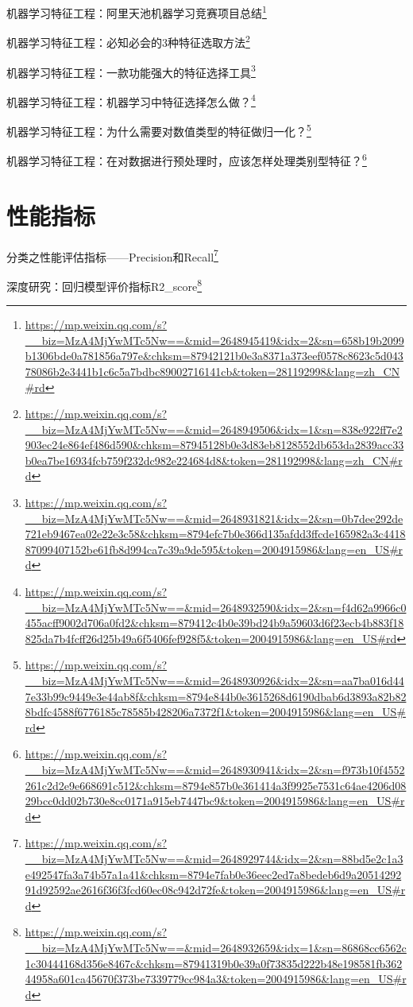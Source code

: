 \documentclass[]{ctexbook}
\renewcommand{\href}[2]{#2\footnote{\url{#1}}}
\begin{document}
\href{https://mp.weixin.qq.com/s?__biz=MzA4MjYwMTc5Nw==\&mid=2648945419\&idx=2\&sn=658b19b2099b1306bde0a781856a797e\&chksm=87942121b0e3a8371a373eef0578c8623c5d04378086b2e3441b1c6c5a7bdbc89002716141cb\&token=281192998\&lang=zh_CN\#rd}{机器学习特征工程：阿里天池机器学习竞赛项目总结}

\href{https://mp.weixin.qq.com/s?__biz=MzA4MjYwMTc5Nw==\&mid=2648949506\&idx=1\&sn=838e922ff7e2903ec24e864ef486d590\&chksm=87945128b0e3d83eb8128552db653da2839acc33b0ea7be16934fcb759f232dc982e224684d8\&token=281192998\&lang=zh_CN\#rd}{机器学习特征工程：必知必会的3种特征选取方法}

\href{https://mp.weixin.qq.com/s?__biz=MzA4MjYwMTc5Nw==\&mid=2648931821\&idx=2\&sn=0b7dee292de721eb9467ea02e22e3c58\&chksm=8794efc7b0e366d135afdd3ffcde165982a3c441887099407152be61fb8d994ca7c39a9de595\&token=2004915986\&lang=en_US\#rd}{机器学习特征工程：一款功能强大的特征选择工具}

\href{https://mp.weixin.qq.com/s?__biz=MzA4MjYwMTc5Nw==\&mid=2648932590\&idx=2\&sn=f4d62a9966c0455acff9002d706a0fd2\&chksm=879412c4b0e39bd24b9a59603d6f23ecb4b883f18825da7b4fcff26d25b49a6f5406fef928f5\&token=2004915986\&lang=en_US\#rd}{机器学习特征工程：机器学习中特征选择怎么做？}

\href{https://mp.weixin.qq.com/s?__biz=MzA4MjYwMTc5Nw==\&mid=2648930926\&idx=2\&sn=aa7ba016d447e33b99c9449e3e44ab8f\&chksm=8794e844b0e3615268d6190dbab6d3893a82b828bdfc4588f6776185c78585b428206a7372f1\&token=2004915986\&lang=en_US\#rd}{机器学习特征工程：为什么需要对数值类型的特征做归一化？}

\href{https://mp.weixin.qq.com/s?__biz=MzA4MjYwMTc5Nw==\&mid=2648930941\&idx=2\&sn=f973b10f4552261c2d2e9e668691c512\&chksm=8794e857b0e361414a3f9925e7531c64ae4206d0829bcc0dd02b730e8cc0171a915eb7447bc9\&token=2004915986\&lang=en_US\#rd}{机器学习特征工程：在对数据进行预处理时，应该怎样处理类别型特征？}

\hypertarget{ux6027ux80fdux6307ux6807}{%
\section{性能指标}\label{ux6027ux80fdux6307ux6807}}

\href{https://mp.weixin.qq.com/s?__biz=MzA4MjYwMTc5Nw==\&mid=2648929744\&idx=2\&sn=88bd5e2c1a3e492547fa3a74b57a1a41\&chksm=8794e7fab0e36eec2ed7a8bedeb6d9a2051429291d92592ae2616f36f3fcd60ec08c942d72fe\&token=2004915986\&lang=en_US\#rd}{分类之性能评估指标------Precision和Recall}

\href{https://mp.weixin.qq.com/s?__biz=MzA4MjYwMTc5Nw==\&mid=2648932659\&idx=1\&sn=86868cc6562c1c30444168d356e8467c\&chksm=87941319b0e39a0f73835d222b48e198581fb36244958a601ca45670f373be7339779cc984a3\&token=2004915986\&lang=en_US\#rd}{深度研究：回归模型评价指标R2\_score}
\end{document}
